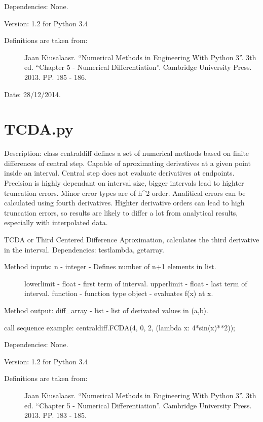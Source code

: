 \documentclass[letterpaper,10pt,oneside]{sphinxmanual}
\theoremstyle{plain}%
\theoremstyle{definition}%
\theoremstyle{remark}%
\begin{document}
Dependencies: None.

Version: 1.2 for Python 3.4
\begin{description}
\item[{Definitions are taken from:}] \leavevmode
Jaan Kiusalaasr. ``Numerical Methods in Engineering With Python 3''.
3th ed. ``Chapter 5 - Numerical Differentiation''. 
Cambridge University Press. 2013. PP. 185 - 186.

\end{description}




Date: 28/12/2014.


\section{TCDA.py}
\label{code:tcda-py}\label{code:module-TCDA}
Description: class centraldiff defines a set of numerical methods based on
finite differences of central step. Capable of aproximating derivatives at
a given point inside an interval. Central step does not evaluate derivatives
at endpoints. Precision is highly dependant on interval size, bigger intervals
lead to highter truncation errors. Minor error types are of h\textasciicircum{}2 order.
Analitical errors can be calculated using fourth derivatives. Highter
derivative orders can lead to high truncation errors, so results are likely
to differ a lot from analytical results, especially with interpolated data.

TCDA or Third Centered Difference Aproximation, calculates the third
derivative in the interval. Dependencies: testlambda, getarray.
\begin{description}
\item[{Method inputs: n - integer - Defines number of n+1 elements in list.}] \leavevmode
lowerlimit - float - first term of interval.
upperlimit - float - last term of interval.
function - function type object - evaluates f(x) at x.

\end{description}

Method output: diff\_array - list - list of derivated values in (a,b).

call sequence example: centraldiff.FCDA(4, 0, 2, (lambda x: 4*sin(x)**2));

Dependencies: None.

Version: 1.2 for Python 3.4
\begin{description}
\item[{Definitions are taken from:}] \leavevmode
Jaan Kiusalaasr. ``Numerical Methods in Engineering With Python 3''.
3th ed. ``Chapter 5 - Numerical Differentiation''. 
Cambridge University Press. 2013. PP. 183 - 185.

\end{description}
\end{document}
